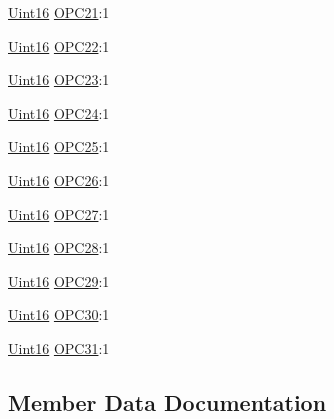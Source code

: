 \begin{DoxyCompactItemize}
\hyperlink{_d_s_p2833x___device_8h_a59a9f6be4562c327cbfb4f7e8e18f08b}{Uint16} \hyperlink{struct_c_a_n_o_p_c___b_i_t_s_ada78634e0f9d6396c7ecfb48b803f01a}{O\+P\+C21}\+:1
\item 
\hyperlink{_d_s_p2833x___device_8h_a59a9f6be4562c327cbfb4f7e8e18f08b}{Uint16} \hyperlink{struct_c_a_n_o_p_c___b_i_t_s_a1e5a02c336c8b947fc77e87ac2e4807b}{O\+P\+C22}\+:1
\item 
\hyperlink{_d_s_p2833x___device_8h_a59a9f6be4562c327cbfb4f7e8e18f08b}{Uint16} \hyperlink{struct_c_a_n_o_p_c___b_i_t_s_a44fd3891b04037a87998478151d07906}{O\+P\+C23}\+:1
\item 
\hyperlink{_d_s_p2833x___device_8h_a59a9f6be4562c327cbfb4f7e8e18f08b}{Uint16} \hyperlink{struct_c_a_n_o_p_c___b_i_t_s_ac04815a280f0e5868851867aced4ca32}{O\+P\+C24}\+:1
\item 
\hyperlink{_d_s_p2833x___device_8h_a59a9f6be4562c327cbfb4f7e8e18f08b}{Uint16} \hyperlink{struct_c_a_n_o_p_c___b_i_t_s_acd70a0b0235eb9502c41c6eb1b218d50}{O\+P\+C25}\+:1
\item 
\hyperlink{_d_s_p2833x___device_8h_a59a9f6be4562c327cbfb4f7e8e18f08b}{Uint16} \hyperlink{struct_c_a_n_o_p_c___b_i_t_s_a0ff16f5f0367570bf4c25c993e7ad1d5}{O\+P\+C26}\+:1
\item 
\hyperlink{_d_s_p2833x___device_8h_a59a9f6be4562c327cbfb4f7e8e18f08b}{Uint16} \hyperlink{struct_c_a_n_o_p_c___b_i_t_s_abab5663cdb8b39b8990ee0e5991ad993}{O\+P\+C27}\+:1
\item 
\hyperlink{_d_s_p2833x___device_8h_a59a9f6be4562c327cbfb4f7e8e18f08b}{Uint16} \hyperlink{struct_c_a_n_o_p_c___b_i_t_s_a8376f9c747b439cc3b3a85d3160bd140}{O\+P\+C28}\+:1
\item 
\hyperlink{_d_s_p2833x___device_8h_a59a9f6be4562c327cbfb4f7e8e18f08b}{Uint16} \hyperlink{struct_c_a_n_o_p_c___b_i_t_s_a83d312055fd9767ce9adea9b2c6fe4bc}{O\+P\+C29}\+:1
\item 
\hyperlink{_d_s_p2833x___device_8h_a59a9f6be4562c327cbfb4f7e8e18f08b}{Uint16} \hyperlink{struct_c_a_n_o_p_c___b_i_t_s_ae5f73a6c20ea74fc4aa9429f2d729fca}{O\+P\+C30}\+:1
\item 
\hyperlink{_d_s_p2833x___device_8h_a59a9f6be4562c327cbfb4f7e8e18f08b}{Uint16} \hyperlink{struct_c_a_n_o_p_c___b_i_t_s_af1a201a27f551b4f099036118945061f}{O\+P\+C31}\+:1
\end{DoxyCompactItemize}


\subsection{Member Data Documentation}
\hypertarget{struct_c_a_n_o_p_c___b_i_t_s_af38a14904c4fc34e92ba00ab08f0db06}{}
